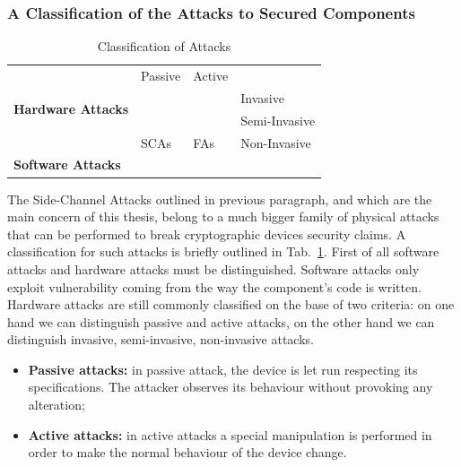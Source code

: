 \subsubsection{A Classification of the Attacks to Secured Components}\label{sec:classification_attacks}
\begin{table}[]
\centering
\caption{Classification of Attacks}
\label{fig:classification_attacks}
\begin{tabular}{|l|lll}
\cline{1-3}
\multirow{4}{*}{\textbf{Hardware Attacks}} & \multicolumn{1}{l|}{Passive} & \multicolumn{1}{l|}{Active} &                                    \\ \cline{2-4} 
                                           & \multicolumn{1}{l|}{}        & \multicolumn{1}{l|}{}       & \multicolumn{1}{l|}{Invasive}      \\ \cline{2-4} 
                                           & \multicolumn{1}{l|}{}        & \multicolumn{1}{l|}{}       & \multicolumn{1}{l|}{Semi-Invasive} \\ \cline{2-4} 
                                           & \multicolumn{1}{l|}{SCAs}    & \multicolumn{1}{l|}{FAs}    & \multicolumn{1}{l|}{Non-Invasive}  \\ \hline
\textbf{Software Attacks}                  &                              &                             &                                    \\ \cline{1-1}
\end{tabular}
\end{table}

The Side-Channel Attacks outlined in previous paragraph, and which are the main concern of this thesis,  belong to a much bigger family of physical attacks that can be performed to break cryptographic devices security claims. A classification for such attacks is briefly outlined in Tab.~\ref{fig:classification_attacks}. First of all software attacks and hardware attacks must be distinguished. Software attacks only exploit vulnerability coming from the way the component's code is written. Hardware attacks are still commonly classified on the base of two criteria: on one hand we can distinguish passive and active attacks, on the other hand we can distinguish invasive, semi-invasive, non-invasive attacks. 
\begin{itemize}
\item[] \textbf{Passive attacks:} in passive attack, the device is let run respecting its specifications. The attacker observes its behaviour without provoking any alteration;
\item[] \textbf{Active attacks:}  in active attacks a special manipulation is performed in order to make the normal behaviour of the device change. 
\end{itemize}


